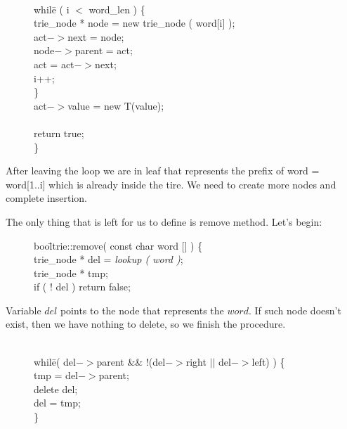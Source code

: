 \documentclass[a4paper,12pt]{article}
\begin{document}
\begin{figure}[!h]
\begin{tabbing}
\quad \quad \= \\
\> whil\=e ( i $<$ word\_len ) \{ \\
\>\>    trie\_node * node = new trie\_node ( word[i] ); \\
\>\>    act$->$next = node; \\
\>\>    node$->$parent = act; \\
\>\>    act = act$->$next; \\
\>\>    i++; \\
\>  \}
\> \\
\>  act$->$value = new T(value); \\
\> \\
\>  return true; \\
\} \\
\end{tabbing}
\end{figure}


\noindent After leaving the loop we are in leaf that represents the prefix of word = word[1..i] which is already inside the tire. We need to create more nodes and complete insertion.

The only thing that is left for us to define is remove method. Let's begin:

\begin{figure}[!h]
\begin{tabbing}
bool\= \quad trie::remove( const char word [] ) \{ \\
\>  trie\_node * del = \emph{lookup ( word )}; \\
\>  trie\_node * tmp; \\
\>  if ( ! del ) return false; \\
\end{tabbing}
\end{figure}

\noindent Variable $del$ points to the node that represents the $word$. If such node doesn't exist, then we have nothing to delete, so we finish the procedure.

\newpage

\begin{figure}[!h]
\begin{tabbing}
\quad \quad \= \\
\>  whil\=e( del$->$parent \&\& !(del$->$right $||$ del$->$left) ) \{ \\
\>\>    tmp = del$->$parent; \\
\>\>    delete del; \\
\>\>    del = tmp; \\
\>  \} \\
\end{tabbing}
\end{figure}
\end{document}
